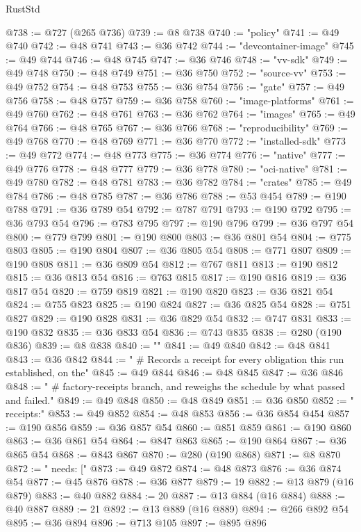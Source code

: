\begin{lexlean}{RustStd}
\begin{coremodule}
@738 := @727 (@265 @736)
@739 := @8 @738
@740 := "policy"
@741 := @49 @740
@742 := @48 @741
@743 := @36 @742
@744 := "devcontainer-image"
@745 := @49 @744
@746 := @48 @745
@747 := @36 @746
@748 := "vv-sdk"
@749 := @49 @748
@750 := @48 @749
@751 := @36 @750
@752 := "source-vv"
@753 := @49 @752
@754 := @48 @753
@755 := @36 @754
@756 := "gate"
@757 := @49 @756
@758 := @48 @757
@759 := @36 @758
@760 := "image-platforms"
@761 := @49 @760
@762 := @48 @761
@763 := @36 @762
@764 := "images"
@765 := @49 @764
@766 := @48 @765
@767 := @36 @766
@768 := "reproducibility"
@769 := @49 @768
@770 := @48 @769
@771 := @36 @770
@772 := "installed-sdk"
@773 := @49 @772
@774 := @48 @773
@775 := @36 @774
@776 := "native"
@777 := @49 @776
@778 := @48 @777
@779 := @36 @778
@780 := "oci-native"
@781 := @49 @780
@782 := @48 @781
@783 := @36 @782
@784 := "crates"
@785 := @49 @784
@786 := @48 @785
@787 := @36 @786
@788 := @53 @454
@789 := @190 @788
@791 := @36 @789 @54
@792 := @787 @791
@793 := @190 @792
@795 := @36 @793 @54
@796 := @783 @795
@797 := @190 @796
@799 := @36 @797 @54
@800 := @779 @799
@801 := @190 @800
@803 := @36 @801 @54
@804 := @775 @803
@805 := @190 @804
@807 := @36 @805 @54
@808 := @771 @807
@809 := @190 @808
@811 := @36 @809 @54
@812 := @767 @811
@813 := @190 @812
@815 := @36 @813 @54
@816 := @763 @815
@817 := @190 @816
@819 := @36 @817 @54
@820 := @759 @819
@821 := @190 @820
@823 := @36 @821 @54
@824 := @755 @823
@825 := @190 @824
@827 := @36 @825 @54
@828 := @751 @827
@829 := @190 @828
@831 := @36 @829 @54
@832 := @747 @831
@833 := @190 @832
@835 := @36 @833 @54
@836 := @743 @835
@838 := @280 (@190 @836)
@839 := @8 @838
@840 := ""
@841 := @49 @840
@842 := @48 @841
@843 := @36 @842
@844 := "  # Records a receipt for every obligation this run established, on the"
@845 := @49 @844
@846 := @48 @845
@847 := @36 @846
@848 := "  # factory-receipts branch, and reweighs the schedule by what passed and failed."
@849 := @49 @848
@850 := @48 @849
@851 := @36 @850
@852 := "  receipts:"
@853 := @49 @852
@854 := @48 @853
@856 := @36 @854 @454
@857 := @190 @856
@859 := @36 @857 @54
@860 := @851 @859
@861 := @190 @860
@863 := @36 @861 @54
@864 := @847 @863
@865 := @190 @864
@867 := @36 @865 @54
@868 := @843 @867
@870 := @280 (@190 @868)
@871 := @8 @870
@872 := "    needs: ["
@873 := @49 @872
@874 := @48 @873
@876 := @36 @874 @54
@877 := @45 @876
@878 := @36 @877
@879 := 19
@882 := @13 @879 (@16 @879)
@883 := @40 @882
@884 := 20
@887 := @13 @884 (@16 @884)
@888 := @40 @887
@889 := 21
@892 := @13 @889 (@16 @889)
@894 := @266 @892 @54
@895 := @36 @894
@896 := @713 @105
@897 := @895 @896

\end{coremodule}
\end{lexlean}
